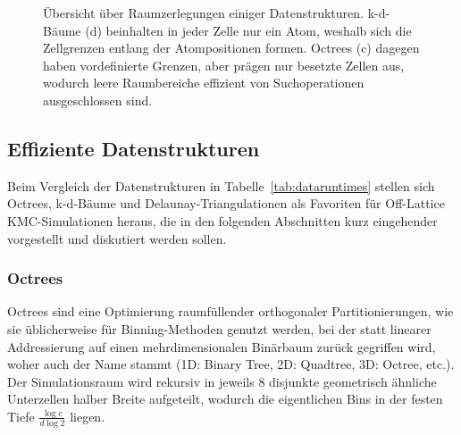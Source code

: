 \begin{figure}[bhpt]
  \caption[Übersicht über räumliche Datenstrukturen]{
    Übersicht über Raumzerlegungen einiger Datenstrukturen.
    k-d-Bäume (d) beinhalten in jeder Zelle nur ein Atom, weshalb sich die Zellgrenzen entlang der Atompositionen formen.
    Octrees (c) dagegen haben vordefinierte Grenzen, aber prägen nur besetzte Zellen aus, wodurch leere Raumbereiche effizient von Suchoperationen ausgeschlossen sind.
  }
  \label{fig:datastructures}
\end{figure}

\subsection{Effiziente Datenstrukturen}

Beim Vergleich der Datenstrukturen in Tabelle~\ref{tab:dataruntimes} stellen sich Octrees, k-d-Bäume und Delaunay-Triangulationen als Favoriten für Off-Lattice KMC-Simulationen heraus, die in den folgenden Abschnitten kurz eingehender vorgestellt und diskutiert werden sollen.

\subsubsection{Octrees}
\label{dataoctree}

Octrees sind eine Optimierung raumfüllender orthogonaler Partitionierungen, wie sie üblicherweise für Binning-Methoden genutzt werden, bei der statt linearer Addressierung auf einen mehrdimensionalen Binärbaum zurück gegriffen wird, woher auch der Name stammt (1D: Binary Tree, 2D: Quadtree, 3D: Octree, etc.).
Der Simulationsraum wird rekursiv in jeweils 8 disjunkte geometrisch ähnliche Unterzellen halber Breite aufgeteilt, wodurch die eigentlichen Bins in der festen Tiefe $\frac{\log{c}}{d\log{2}}$ liegen.

